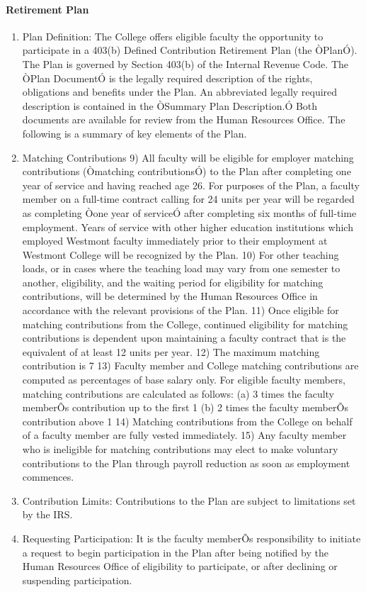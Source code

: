 \documentclass[letterpaper, 11pt]{article}
\begin{document}
			\paragraph{Retirement Plan}
				\begin{enumerate}[label=\alph*)]
					\item{Plan Definition:  The College offers eligible faculty the opportunity to participate in a 403(b) Defined Contribution Retirement Plan (the ÒPlanÓ).  The Plan is governed by Section 403(b) of the Internal Revenue Code.  The ÒPlan DocumentÓ is the legally required description of the rights, obligations and benefits under the Plan.  An abbreviated legally required description is contained in the ÒSummary Plan Description.Ó  Both documents are available for review from the Human Resources Office.  The following is a summary of key elements of the Plan.}
					\item{Matching Contributions}
					9) All faculty will be eligible for employer matching contributions (Òmatching contributionsÓ) to the Plan after completing one year of service and having reached age 26.  For purposes of the Plan, a faculty member on a full-time contract calling for 24 units per year will be regarded as completing Òone year of serviceÓ after completing six months of full-time employment.  Years of service with other higher education institutions which employed Westmont faculty immediately prior to their employment at Westmont College will be recognized by the Plan.
					10) For other teaching loads, or in cases where the teaching load may vary from one semester to another, eligibility, and the waiting period for eligibility for matching contributions, will be determined by the Human Resources Office in accordance with the relevant provisions of the Plan.
					11) Once eligible for matching contributions from the College, continued eligibility for matching contributions is dependent upon maintaining a faculty contract that is the equivalent of at least 12 units per year.
					12) The maximum matching contribution is 7%
					13) Faculty member and College matching contributions are computed as percentages of base salary only.  For eligible faculty members, matching contributions are calculated as follows:
					(a) 3 times the faculty memberÕs contribution up to the first 1%
					(b) 2 times the faculty memberÕs contribution above 1%
					14) Matching contributions from the College on behalf of a faculty member are fully vested immediately.
					15) Any faculty member who is ineligible for matching contributions may elect to make voluntary contributions to the Plan through payroll reduction as soon as employment commences.
					\item{Contribution Limits:  Contributions to the Plan are subject to limitations set by the IRS.}
					\item{Requesting Participation:  It is the faculty memberÕs responsibility to initiate a request to begin participation in the Plan after being notified by the Human Resources Office of eligibility to participate, or after declining or suspending participation.}
				\end{enumerate}
\end{document}
